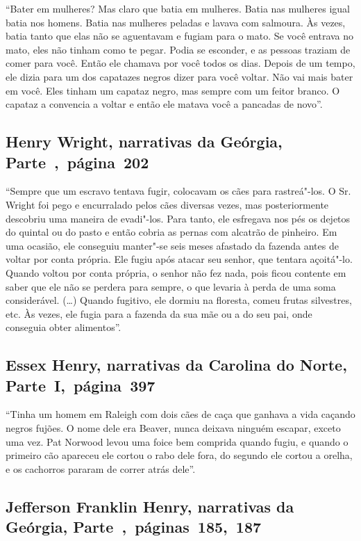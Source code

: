 ``Bater em mulheres? Mas claro que batia em mulheres. Batia nas
mulheres igual batia nos homens. Batia nas mulheres peladas e lavava com
salmoura. Às vezes, batia tanto que elas não se aguentavam e fugiam para
o mato. Se você entrava no mato, eles não tinham como te pegar. Podia
se esconder, e as pessoas traziam de comer para você. Então ele chamava
por você todos os dias. Depois de um tempo, ele dizia para um dos
capatazes negros dizer para você voltar. Não vai mais bater em você.
Eles tinham um capataz negro, mas sempre com um feitor branco. O capataz
a convencia a voltar e então ele matava você a pancadas de novo''.

\subsection{Henry Wright, narrativas da Geórgia, Parte~,~página~202}
\label{ref321}

``Sempre que um escravo tentava fugir, colocavam os cães para
rastreá"-los. O Sr. Wright foi pego e encurralado pelos cães diversas
vezes, mas posteriormente descobriu uma maneira de evadi"-los. Para
tanto, ele esfregava nos pés os dejetos do quintal ou do pasto e então
cobria as pernas com alcatrão de pinheiro. Em uma ocasião, ele conseguiu
manter"-se seis meses afastado da fazenda antes de voltar por conta
própria. Ele fugiu após atacar seu senhor, que tentara açoitá"-lo. Quando
voltou por conta própria, o senhor não fez nada, pois ficou contente em
saber que ele não se perdera para sempre, o que levaria à perda de uma
soma considerável. (\ldots{}) Quando fugitivo, ele dormiu na floresta,
comeu frutas silvestres, etc. Às vezes, ele fugia para a fazenda da sua
mãe ou a do seu pai, onde conseguia obter alimentos''.

\subsection{Essex Henry, narrativas da Carolina do Norte, Parte~I,~página~397}
\label{ref138}

``Tinha um homem em Raleigh com dois cães de caça que ganhava a vida
caçando negros fujões. O nome dele era Beaver, nunca deixava ninguém
escapar, exceto uma vez. Pat Norwood levou uma foice bem comprida quando
fugiu, e quando o primeiro cão apareceu ele cortou o rabo dele fora, do
segundo ele cortou a orelha, e os cachorros pararam de correr atrás
dele''.

\subsection{Jefferson Franklin Henry, narrativas da Geórgia, Parte~,~páginas~185,~187}
\label{ref140}

